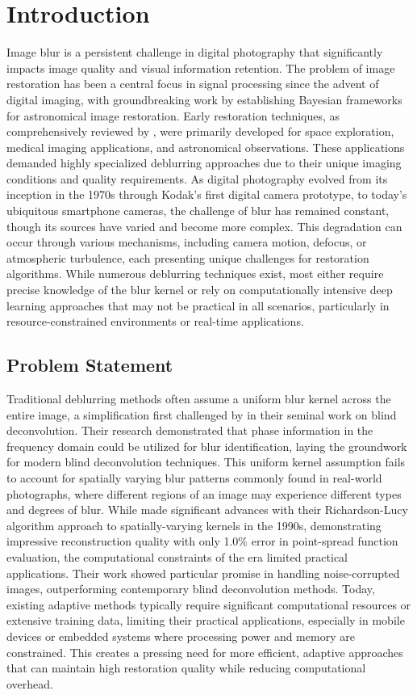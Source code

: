 \documentclass[twoside,11pt]{article}
\begin{document}
\section{Introduction}
Image blur is a persistent challenge in digital photography that significantly impacts image quality and visual information retention. The problem of image restoration has been a central focus in signal processing since the advent of digital imaging, with groundbreaking work by \citet{molina2001image} establishing Bayesian frameworks for astronomical image restoration. Early restoration techniques, as comprehensively reviewed by \citet{banham1997digital}, were primarily developed for space exploration, medical imaging applications, and astronomical observations. These applications demanded highly specialized deblurring approaches due to their unique imaging conditions and quality requirements. As digital photography evolved from its inception in the 1970s through Kodak's first digital camera prototype, to today's ubiquitous smartphone cameras, the challenge of blur has remained constant, though its sources have varied and become more complex. This degradation can occur through various mechanisms, including camera motion, defocus, or atmospheric turbulence, each presenting unique challenges for restoration algorithms. While numerous deblurring techniques exist, most either require precise knowledge of the blur kernel or rely on computationally intensive deep learning approaches that may not be practical in all scenarios, particularly in resource-constrained environments or real-time applications.
\subsection{Problem Statement}
Traditional deblurring methods often assume a uniform blur kernel across the entire image, a simplification first challenged by \citet{cannon1976blind} in their seminal work on blind deconvolution. Their research demonstrated that phase information in the frequency domain could be utilized for blur identification, laying the groundwork for modern blind deconvolution techniques. This uniform kernel assumption fails to account for spatially varying blur patterns commonly found in real-world photographs, where different regions of an image may experience different types and degrees of blur. While \citet{fish1995blind} made significant advances with their Richardson-Lucy algorithm approach to spatially-varying kernels in the 1990s, demonstrating impressive reconstruction quality with only 1.0\% error in point-spread function evaluation, the computational constraints of the era limited practical applications. Their work showed particular promise in handling noise-corrupted images, outperforming contemporary blind deconvolution methods. Today, existing adaptive methods typically require significant computational resources or extensive training data, limiting their practical applications, especially in mobile devices or embedded systems where processing power and memory are constrained. This creates a pressing need for more efficient, adaptive approaches that can maintain high restoration quality while reducing computational overhead.
\end{document}
